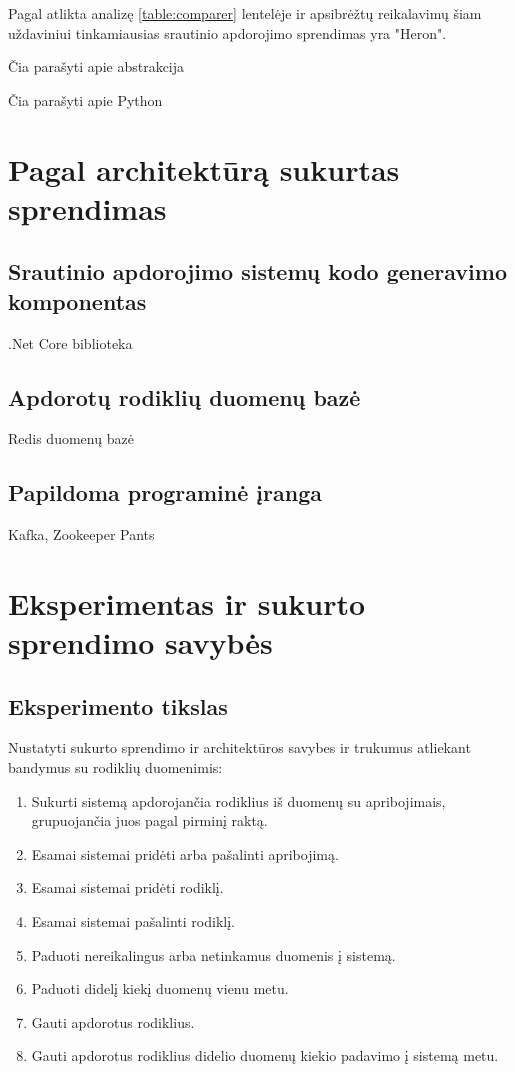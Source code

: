 \documentclass{VUMIFPSbakalaurinis}
\begin{document}
Pagal atlikta analizę \ref{table:comparer} lentelėje ir apsibrėžtų reikalavimų šiam uždaviniui tinkamiausias srautinio apdorojimo sprendimas yra "Heron". \par
Čia parašyti apie abstrakcija \par
Čia parašyti apie Python \par
 

\section{Pagal architektūrą sukurtas sprendimas}

\subsection{Srautinio apdorojimo sistemų kodo generavimo komponentas}

.Net Core biblioteka 

\subsection{Apdorotų rodiklių duomenų bazė}

Redis duomenų bazė

\subsection{Papildoma programinė įranga}
Kafka, Zookeeper Pants

\section{Eksperimentas ir sukurto sprendimo savybės}

\subsection{Eksperimento tikslas}

Nustatyti sukurto sprendimo ir architektūros savybes ir trukumus atliekant bandymus su rodiklių duomenimis:
\begin{enumerate}
    \item Sukurti sistemą apdorojančia rodiklius iš duomenų su apribojimais, grupuojančia juos pagal pirminį raktą.
    \item Esamai sistemai pridėti arba pašalinti apribojimą.
    \item Esamai sistemai pridėti rodiklį.
    \item Esamai sistemai pašalinti rodiklį. 
    \item Paduoti nereikalingus arba netinkamus duomenis į sistemą.
    \item Paduoti didelį kiekį duomenų vienu metu.
    \item Gauti apdorotus rodiklius.
    \item Gauti apdorotus rodiklius didelio duomenų kiekio padavimo į sistemą metu.
\end{enumerate}
\end{document}
